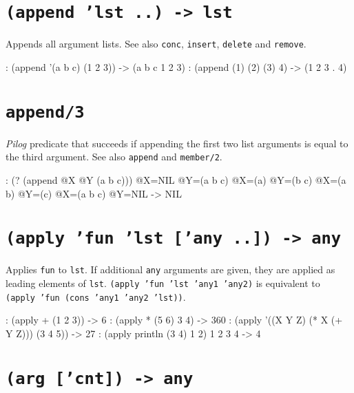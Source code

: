  
\section*{\texttt{(append 'lst ..) -> lst}}
\label{sec:func-ref-A-(append 'lst ..) -> lst}


Appends all argument lists. See also \texttt{conc}, \texttt{insert}, \texttt{delete} and
\texttt{remove}.


\begin{wideverbatim}
: (append '(a b c) (1 2 3))
-> (a b c 1 2 3)
: (append (1) (2) (3) 4)
-> (1 2 3 . 4)
\end{wideverbatim}

 
\section*{\texttt{append/3}}
\label{sec:func-ref-A-append/3}


\emph{Pilog} predicate that succeeds if appending the first
two list arguments is equal to the third argument. See also \texttt{append} and
\texttt{member/2}.


\begin{wideverbatim}
: (? (append @X @Y (a b c)))
 @X=NIL @Y=(a b c)
 @X=(a) @Y=(b c)
 @X=(a b) @Y=(c)
 @X=(a b c) @Y=NIL
-> NIL
\end{wideverbatim}

 
\section*{\texttt{(apply 'fun 'lst ['any ..]) -> any}}
\label{sec:func-ref-A-(apply 'fun 'lst ['any ..]) -> any}


Applies \texttt{fun} to \texttt{lst}. If additional \texttt{any} arguments are given, they
are applied as leading elements of \texttt{lst}.
\texttt{(apply 'fun 'lst 'any1 'any2)} is equivalent to
\texttt{(apply 'fun (cons 'any1 'any2 'lst))}.


\begin{wideverbatim}
: (apply + (1 2 3))
-> 6
: (apply * (5 6) 3 4)
-> 360
: (apply '((X Y Z) (* X (+ Y Z))) (3 4 5))
-> 27
: (apply println (3 4) 1 2)
1 2 3 4
-> 4
\end{wideverbatim}

 
\section*{\texttt{(arg ['cnt]) -> any}}
\label{sec:func-ref-A-(arg ['cnt]) -> any}


